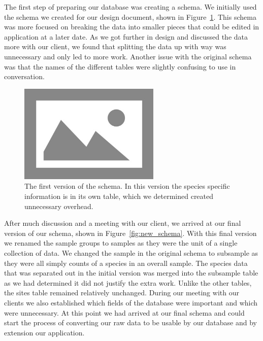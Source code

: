 \documentclass[10pt,draftclsnofoot,onecolumn]{IEEEtran}
\begin{document}
The first step of preparing our database was creating a schema.
We initially used the schema we created for our design document, shown in Figure~\ref{fig:old_schema}.
This schema was more focused on breaking the data into smaller pieces that could be edited in application at a later date.
As we got further in design and discussed the data more with our client, we found that splitting the data up with way was unnecessary and only led to more work.
Another issue with the original schema was that the names of the different tables were slightly confusing to use in conversation.

\begin{figure}[h]
	\centering
	\includegraphics[width=0.60\textwidth]{images/old_schema.png}
	\captionsetup{justification=centering}
	\caption{
		The first version of the schema.
		In this version the species specific information is in its own table, which we determined created unnecessary overhead.
	}
	\label{fig:old_schema}
\end{figure}

After much discussion and a meeting with our client, we arrived at our final version of our schema, shown in Figure~\ref{fig:new_schema}.
With this final version we renamed the sample groups to samples as they were the unit of a single collection of data.
We changed the sample in the original schema to subsample as they were all simply counts of a species in an overall sample.
The species data that was separated out in the initial version was merged into the subsample table as we had determined it did not justify the extra work.
Unlike the other tables, the sites table remained relatively unchanged.
During our meeting with our clients we also established which fields of the database were important and which were unnecessary.
At this point we had arrived at our final schema and could start the process of converting our raw data to be usable by our database and by extension our application.
\end{document}
